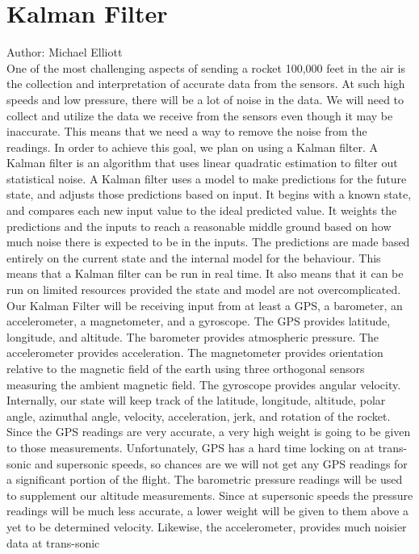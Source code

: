 \documentclass[onecolumn, draftclsnofoot,10pt, compsoc]{IEEEtran}
\begin{document}
\section{Kalman Filter}
Author: Michael Elliott\\
One of the most challenging aspects of sending a rocket 100,000 feet
in the air is the collection and interpretation of accurate data from
the sensors.
At such high speeds and low pressure, there will be a lot of noise in the data.
We will need to collect and utilize the data we receive from the
sensors even though it may be inaccurate.
This means that we need a way to remove the noise from the readings.
In order to achieve this goal, we plan on using a Kalman filter.
A Kalman filter is an algorithm that uses linear quadratic estimation
to filter out statistical noise.
A Kalman filter uses a model to make predictions for the future state,
and adjusts those predictions based on input.
It begins with a known state, and compares each new input value to the
ideal predicted value.
It weights the predictions and the inputs to reach a reasonable middle
ground based on how much noise there is expected to be in the inputs.
The predictions are made based entirely on the current state and the
internal model for the behaviour.
This means that a Kalman filter can be run in real time.
It also means that it can be run on limited resources provided the
state and model are not overcomplicated.
Our Kalman Filter will be receiving input from at least a GPS, a
barometer, an accelerometer, a magnetometer, and a gyroscope.
The GPS provides latitude, longitude, and altitude.
The barometer provides atmospheric pressure.
The accelerometer provides acceleration.
The magnetometer provides orientation relative to the magnetic field
of the earth using three orthogonal sensors measuring the ambient
magnetic field.
The gyroscope provides angular velocity.
Internally, our state will keep track of the latitude, longitude,
altitude, polar angle, azimuthal angle, velocity, acceleration, jerk,
and rotation of the rocket.
Since the GPS readings are very accurate, a very high weight is going
to be given to those measurements.
Unfortunately, GPS has a hard time locking on at trans-sonic and
supersonic speeds, so chances are we will not get any GPS readings for
a significant portion of the flight.
The barometric pressure readings will be used to supplement our
altitude measurements.
Since at supersonic speeds the pressure readings will be much less
accurate, a lower weight will be given to them above a yet to be
determined velocity.
Likewise, the accelerometer, provides much noisier data at trans-sonic
\end{document}
